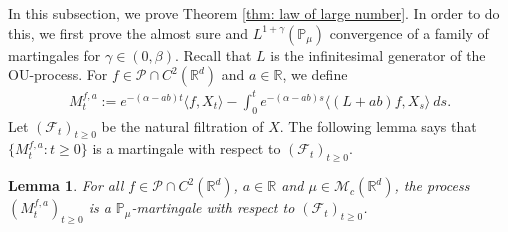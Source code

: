 \documentclass[12pt,a4paper]{amsart}
\theoremstyle{plain}
\newtheorem{lem}[thm]{Lemma}
\theoremstyle{definition}
\numberwithin{equation}{section}
\begin{document}
In this subsection, we prove Theorem \ref{thm: law of large number}.
In order to do this, we first prove the almost sure and $L^{1+\gamma}(\mathbb{P}_{\mu})$ convergence of a family of martingales for $\gamma\in (0, \beta)$. Recall that $L$ is the infinitesimal generator of the OU-process.  For $f\in \mathcal{P}\cap C^2(\mathbb R^d)$ and  $a\in \mathbb R$, we define
\begin{align}
  \label{defmartingale}
  M_t^{f,a}
  :=e^{-(\alpha-ab)t}\langle f,X_t\rangle-\int_0^t e^{-(\alpha-ab)s}\langle (L+ab)f, X_s\rangle~ ds.
\end{align}
Let $(\mathscr{F}_t)_{t\geq 0}$ be the natural filtration of $X$.  The following lemma says that $\{M_t^{f,a}: t\geq 0\}$ is a martingale with respect to $(\mathscr{F}_t)_{t\geq 0}$.
\begin{lem}
  \label{lemma25}
  For all $f\in \mathcal{P}\cap C^2(\mathbb R^d)$, $a\in \mathbb R$ and $\mu\in \mathcal M_c(\mathbb R^d)$, the process $(M_t^{f,a})_{t\geq 0}$ is a $\mathbb P_\mu$-martingale with respect to $(\mathscr F_t)_{t\geq 0}$.
\end{lem}
\end{document}
